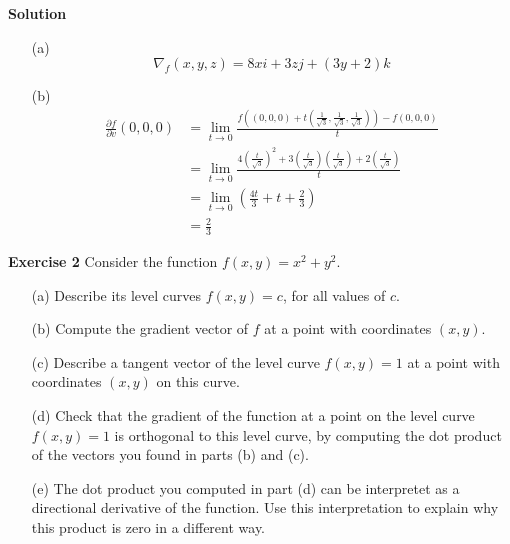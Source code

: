 \documentclass[12pt,oneside]{exam}
\newenvironment{exercise}[1]{\vspace{.1in}\noindent\textbf{Exercise #1 \hspace{.05em}}}{}
\newenvironment{newsolution}{\vspace{.1in}\noindent\textbf{Solution \hspace{.05em}}}{}
\begin{document}
\begin{newsolution}
\begin{itemize}
\item[(a)] 
\begin{equation*}
\nabla_{f} (x,y,z)=8x i + 3zj + (3y+2)k
\end{equation*}
\item[(b)] 
\begin{align*}
\frac{\partial f}{\partial v} (0,0,0) & = \lim_{t \to 0} \frac{f\left((0,0,0)+t\left(\frac{1}{\sqrt{3}}, \frac{1}{\sqrt{3}}, \frac{1}{\sqrt{3}}\right)\right) - f(0,0,0)}{t} \\
& = \lim_{t \to 0} \frac{4\left(\frac{t}{\sqrt{3}}\right)^2 + 3\left( \frac{t}{\sqrt{3}} \right)\left( \frac{t}{\sqrt{3}} \right) + 2 \left( \frac{t}{\sqrt{3}} \right)}{t} \\
& = \lim_{t \to 0} \left(\frac{4t}{3}  + t + \frac{2}{3}\right) \\
& = \frac{2}{3}
\end{align*}
\end{itemize}
\end{newsolution}

\begin{exercise}{2} 
Consider the function $f(x,y)=x^2+y^2$. 
\begin{itemize}
\item[(a)] Describe its level curves $f(x,y)=c$, for all values of $c$. 
\item[(b)] Compute the gradient vector of $f$ at a point with coordinates $(x,y)$. 
\item[(c)] Describe a tangent vector of the level curve $f(x,y)=1$ at a point with coordinates $(x,y)$ on this curve. 
\item[(d)] Check that the gradient of the function at a point on the level curve $f(x,y)=1$ is orthogonal to this level curve, by computing the dot product of the vectors you found in parts (b) and (c). 
\item[(e)] The dot product you computed in part (d) can be interpretet as a directional derivative of the function. Use this interpretation to explain why this product is zero in a different way. 
\end{itemize}
\end{exercise}
\end{document}
